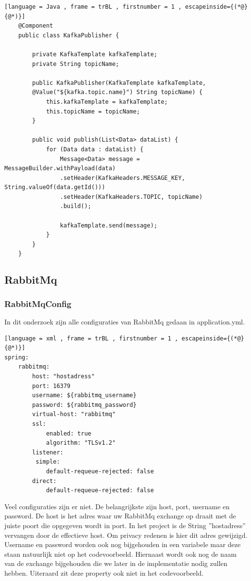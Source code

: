         \begin{lstlisting}[language = Java , frame = trBL , firstnumber = 1 , escapeinside={(*@}{@*)}]
    @Component
    public class KafkaPublisher {
        
        private KafkaTemplate kafkaTemplate;
        private String topicName;
        
        public KafkaPublisher(KafkaTemplate kafkaTemplate,
        @Value("${kafka.topic.name}") String topicName) {
            this.kafkaTemplate = kafkaTemplate;
            this.topicName = topicName;
        }
        
        public void publish(List<Data> dataList) {
            for (Data data : dataList) {
                Message<Data> message = MessageBuilder.withPayload(data)
                .setHeader(KafkaHeaders.MESSAGE_KEY, String.valueOf(data.getId()))
                .setHeader(KafkaHeaders.TOPIC, topicName)
                .build();
                
                kafkaTemplate.send(message);
            }
        }
    }
     \end{lstlisting}
\subsection{RabbitMq}
\subsubsection{RabbitMqConfig}
In dit onderzoek zijn alle configuraties van RabbitMq gedaan in application.yml. 
        \begin{lstlisting}[language = xml , frame = trBL , firstnumber = 1 , escapeinside={(*@}{@*)}]
spring:
    rabbitmq:
        host: "hostadress"
        port: 16379
        username: ${rabbitmq_username}
        password: ${rabbitmq_password}
        virtual-host: "rabbitmq"
        ssl:
            enabled: true
            algorithm: "TLSv1.2"
        listener:
         simple:
            default-requeue-rejected: false
        direct:
            default-requeue-rejected: false
     \end{lstlisting}
     
     Veel configuraties zijn er niet. De belangrijkste zijn host, port, username en password. De host is het adres waar uw RabbitMq exchange op draait met de juiste poort die opgegeven wordt in port. In het project is de String ''hostadress'' vervangen door de effectieve host. Om privacy redenen is hier dit adres gewijzigd. Username en password worden ook nog bijgehouden in een variabele maar deze staan natuurlijk niet op het codevoorbeeld. Hiernaast wordt ook nog de naam van de exchange bijgehouden die we later in de implementatie nodig zullen hebben. Uiteraard zit deze property ook niet in het codevoorbeeld.
     
